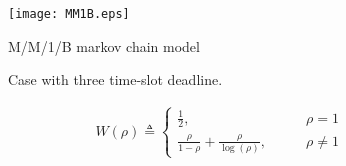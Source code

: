 
\begin{figure}[!h]
	\begin{center}
		\texttt{[image: MM1B.eps]}
		\caption{M/M/1/B markov chain model}
		\label{fig:MM1B}
		\vspace{-0.35in}
	\end{center}
	\vspace{15mm}
\end{figure}

	\begin{figure*}[htp!]
		\vspace{-0.1in}
		\centerline{ 
			\hspace{-0.2in}
				}%
		\caption{Case with three time-slot deadline.}
		\label{Fig:GeneralCase}
	\end{figure*}


\begin{align}
		W(\rho) \triangleq\begin{cases}
		\frac{1}{2}, &\qquad   \rho = 1 \\
		\frac{\rho}{1-\rho} + \frac{\rho}{\log(\rho)},  &\qquad \rho\neq 1
		\end{cases}
	\end{align}

\documentclass{article}
\usepackage{amsmath}

\[
  \sum_{\substack{i=0 \\ i\neq 4}}^n i
\]

In inline math: $\sum_{\substack{i=0 \\ i\neq 4}}^n i$, or
$\sum\limits_{\substack{i=0 \\ i\neq 4}}^n i$

